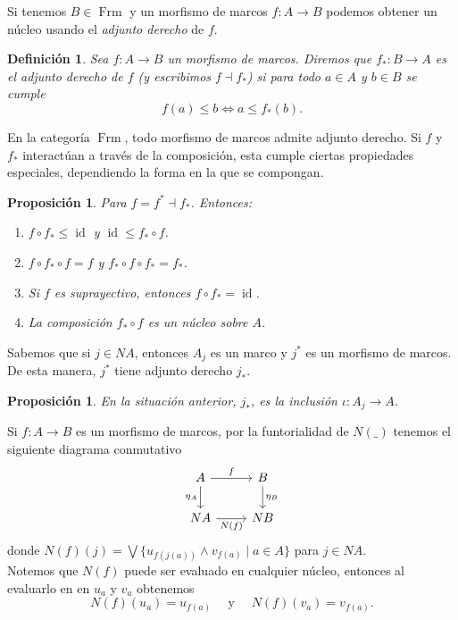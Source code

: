 \documentclass[12pt]{article}
\newtheorem{dfn}[thm]{Definición}
\newtheorem{prop}[thm]{Proposición}
\DeclareMathOperator{\Frm}{Frm}
\DeclareMathOperator{\id}{id}
\begin{document}
Si tenemos $B\in \Frm$ y un morfismo de marcos $f\colon A\to B$ podemos obtener un núcleo usando el \emph{adjunto derecho} de $f$.

\begin{dfn}\label{adjunto}
Sea $f\colon A\to B$ un morfismo de marcos. Diremos que $f_*\colon B\to A$ es el adjunto derecho de $f$ (y escribimos $f\dashv f_*$) 
si para todo $a\in A$ y $b\in B$ se cumple
\[
f(a)\leq b\Longleftrightarrow a\leq f_*(b).
\]
\end{dfn}

En la categoría $\Frm$, todo morfismo de marcos admite adjunto derecho. Si $f$ y $f_*$ interactúan a través de la composición, esta cumple ciertas
propiedades especiales, dependiendo la forma en la que se compongan.

\begin{prop}\label{propadjunto}
    Para $f=f^*\dashv f_*$. Entonces:
    \begin{enumerate}
        \item $f\circ f_*\leq \id$ y $\id\leq f_*\circ f$.
        \item $f\circ f_*\circ f=f$ y $f_*\circ f\circ f_*=f_*$.
        \item Si $f$ es suprayectivo, entonces $f\circ f_*=\id$.
        \item La composición $f_*\circ f$ es un núcleo sobre $A$.   
    \end{enumerate}
\end{prop}

Sabemos que si $j\in NA$, entonces $A_j$ es un marco y $j^*$ es un morfismo de marcos. De esta manera, $j^*$ tiene adjunto derecho $j_*$.
\begin{prop}
     En la situación anterior, $j_*$, es la inclusión $\iota\colon A_j\to A$. 
\end{prop}

Si $f\colon A\to B$ es un morfismo de marcos, por la funtorialidad de $N(\_)$ tenemos el siguiente diagrama conmutativo
\[\begin{tikzcd}
	A & B \\
	NA & NB
	\arrow["f", from=1-1, to=1-2]
	\arrow["{\eta_A}"', from=1-1, to=2-1]
	\arrow["{\eta_B}", from=1-2, to=2-2]
	\arrow["{N(f)}"', from=2-1, to=2-2]
\end{tikzcd}\]
donde $N(f)(j)=\bigvee\{u_{f(j(a))}\wedge v_{f(a)}\mid a\in A\}$ para $j\in NA$.\\

Notemos que $N(f)$ puede ser evaluado en cualquier núcleo, entonces al evaluarlo en 
en $u_a$ y $v_a$ obtenemos
\[
N(f)(u_a)=u_{f(a)}\quad\mbox{ y }\quad N(f)(v_a)=v_{f(a)}.
\]
\end{document}
